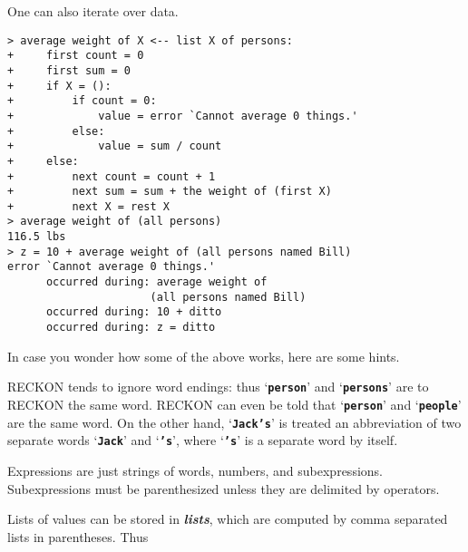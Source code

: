 \documentclass[12pt]{article}
\newcommand{\TT}[1]{{\tt \bfseries #1}}
\newcommand{\skey}[2]{{\bf \em #1#2}\index{#1}}
\newenvironment{indpar}[1][0.3in]%
	{\begin{list}{}%
		     {\setlength{\itemsep}{0in}%
		      \setlength{\topsep}{0in}%
		      \setlength{\parsep}{1ex}%
		      \setlength{\labelwidth}{#1}%
		      \setlength{\leftmargin}{#1}%
		      \addtolength{\leftmargin}{\labelsep}}%
	 \item}%
	{\end{list}}
\begin{document}
One can also iterate over data.

\begin{indpar}
\verb|> average weight of X <-- list X of persons:| \\
\verb|+     first count = 0| \\
\verb|+     first sum = 0| \\
\verb|+     if X = ():| \\
\verb|+         if count = 0:| \\
\verb|+             value = error `Cannot average 0 things.'| \\
\verb|+         else:| \\
\verb|+             value = sum / count| \\
\verb|+     else:| \\
\verb|+         next count = count + 1| \\
\verb|+         next sum = sum + the weight of (first X)| \\
\verb|+         next X = rest X| \\
\verb|> average weight of (all persons)| \\
\verb|116.5 lbs| \\
\verb|> z = 10 + average weight of (all persons named Bill)| \\
\verb|error `Cannot average 0 things.'| \\
\verb|      occurred during: average weight of| \\
\verb|                      (all persons named Bill)| \\
\verb|      occurred during: 10 + ditto| \\
\verb|      occurred during: z = ditto|
\end{indpar}

In case you wonder how some of the above works, here are some hints.

RECKON tends to ignore word endings: thus `\TT{person}' and
`\TT{persons}' are to RECKON the same word.
RECKON can even be told that `\TT{person}'
and `\TT{people}' are the same word.
On the other hand, `\TT{Jack's}' is treated an abbreviation
of two separate words `\TT{Jack}' and `\TT{'s}', where `\TT{'s}' is
a separate word by itself.

Expressions are just strings of words, numbers, and subexpressions.
Subexpressions must be parenthesized unless they
are delimited by operators.

Lists of values can be stored in \skey{list}s, which are computed by comma
separated lists in parentheses.  Thus
\end{document}
